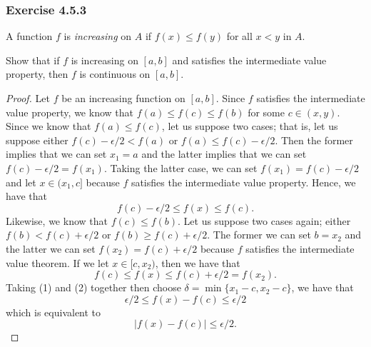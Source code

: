 \subsubsection{Exercise 4.5.3} 
\begin{tcolorbox}
\begin{defn}
A function \( f  \) is \textit{increasing} on \( A  \) if \( f(x) \leq f(y) \) for all \( x < y  \) in \( A  \).
\end{defn}
\end{tcolorbox}
Show that if \( f  \) is increasing on \( [a,b]  \) and satisfies the intermediate value property, then \( f  \) is continuous on \( [a,b] \).
\begin{proof}
    Let \( f  \) be an increasing function on \( [a,b] \). Since \( f  \) satisfies the intermediate value property, we know that \( f(a) \leq f(c) \leq f(b) \) for some \( c \in (x,y)  \). Since we know that \( f(a) \leq f(c)  \), let us suppose two cases; that is, let us suppose either \( f(c) - \epsilon  / 2 < f(a)  \) or \( f(a) \leq f(c) - \epsilon / 2  \). Then the former implies that we can set \( x_1 = a  \) and the latter implies that we can set \( f(c) - \epsilon / 2 = f(x_1) \). Taking the latter case, we can set \( f(x_1) = f(c) - \epsilon  / 2   \) and let \( x \in (x_1, c] \) because \( f  \) satisfies the intermediate value property. Hence, we have that 
    \[  f(c) - \epsilon / 2 \leq f(x) \leq f(c) \tag{1}. \]
    Likewise, we know that \( f(c) \leq f(b)  \). Let us suppose two cases again; either \( f(b) < f(c) + \epsilon  / 2  \) or \( f(b) \geq f(c) + \epsilon / 2  \). The former we can set \( b = x_2  \) and the latter we can set \( f(x_2) = f(c) + \epsilon  / 2  \) because \( f  \) satisfies the intermediate value theorem. If we let \( x \in [c, x_2) \), then we have that 
    \[  f(c) \leq f(x) \leq f(c) + \epsilon / 2 = f(x_2) \tag{2}. \]
    Taking (1) and (2) together then choose \( \delta = \min \{ x_1 - c, x_2 - c  \}  \), we have that 
    \[   \epsilon / 2 \leq f(x) - f(c) \leq \epsilon / 2 \]
    which is equivalent to 
    \[  | f(x) - f(c)  | \leq \epsilon / 2. \]
\end{proof}



